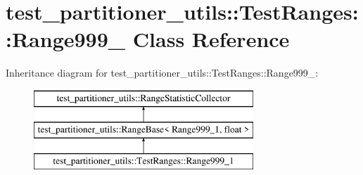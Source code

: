 \hypertarget{classtest__partitioner__utils_1_1TestRanges_1_1Range999__1}{}\section{test\+\_\+partitioner\+\_\+utils\+:\+:Test\+Ranges\+:\+:Range999\+\_ Class Reference}
\label{classtest__partitioner__utils_1_1TestRanges_1_1Range999__1}
Inheritance diagram for test\+\_\+partitioner\+\_\+utils\+:\+:Test\+Ranges\+:\+:Range999\+\_\+:\begin{figure}[H]
\begin{center}
\leavevmode
\includegraphics[height=3.000000cm]{classtest__partitioner__utils_1_1TestRanges_1_1Range999__1}
\end{center}
\end{figure}
